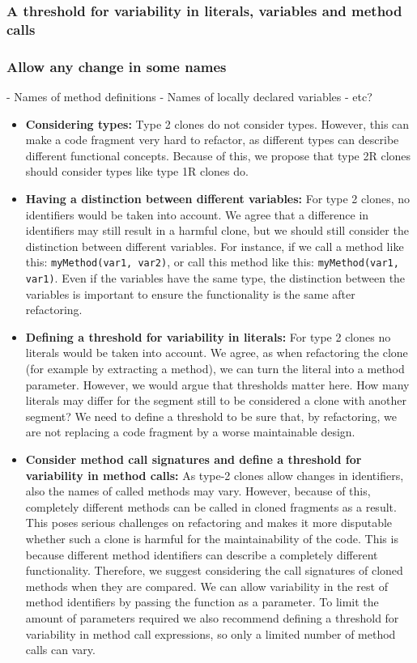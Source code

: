 \subsubsection{A threshold for variability in literals, variables and method calls}

\subsubsection{Allow any change in some names}
- Names of method definitions
- Names of locally declared variables
- etc?

\begin{itemize}
  \item \textbf{Considering types:} Type 2 clones do not consider types. However, this can make a code fragment very hard to refactor, as different types can describe different functional concepts. Because of this, we propose that type 2R clones should consider types like type 1R clones do.
  \item \textbf{Having a distinction between different variables:} For type 2 clones, no identifiers would be taken into account. We agree that a difference in identifiers may still result in a harmful clone, but we should still consider the distinction between different variables. For instance, if we call a method like this: \texttt{myMethod(var1, var2)}, or call this method like this: \texttt{myMethod(var1, var1)}. Even if the variables have the same type, the distinction between the variables is important to ensure the functionality is the same after refactoring.
  \item \textbf{Defining a threshold for variability in literals:} For type 2 clones no literals would be taken into account. We agree, as when refactoring the clone (for example by extracting a method), we can turn the literal into a method parameter. However, we would argue that thresholds matter here. How many literals may differ for the segment still to be considered a clone with another segment? We need to define a threshold to be sure that, by refactoring, we are not replacing a code fragment by a worse maintainable design.
  \item \textbf{Consider method call signatures and define a threshold for variability in method calls:} As type-2 clones allow changes in identifiers, also the names of called methods may vary. However, because of this, completely different methods can be called in cloned fragments as a result. This poses serious challenges on refactoring and makes it more disputable whether such a clone is harmful for the maintainability of the code. This is because different method identifiers can describe a completely different functionality. Therefore, we suggest considering the call signatures of cloned methods when they are compared. We can allow variability in the rest of method identifiers by passing the function as a parameter. To limit the amount of parameters required we also recommend defining a threshold for variability in method call expressions, so only a limited number of method calls can vary.
\end{itemize}

